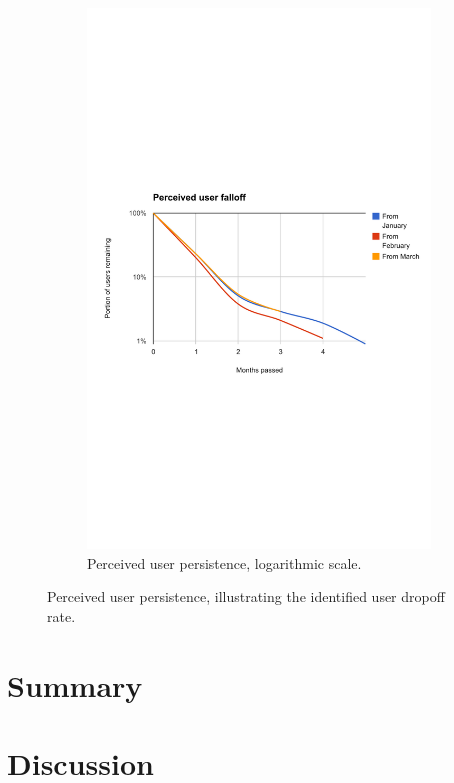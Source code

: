 \begin{figure}[t]
  \begin{subfigure}[t]{\textwidth}
    \includegraphics[width=\textwidth]{Figures/plots/user-dropoff/months-jan-mar-log}
    \caption{Perceived user persistence, logarithmic scale.}
  \end{subfigure}

  \caption{Perceived user persistence, illustrating the identified user dropoff rate.}
  \label{fig:perceived_user_persistence}
\end{figure}

\section{Summary} %
\label{eval:sec:summary}



\section{Discussion} %
\label{eval:sec:discussion}


